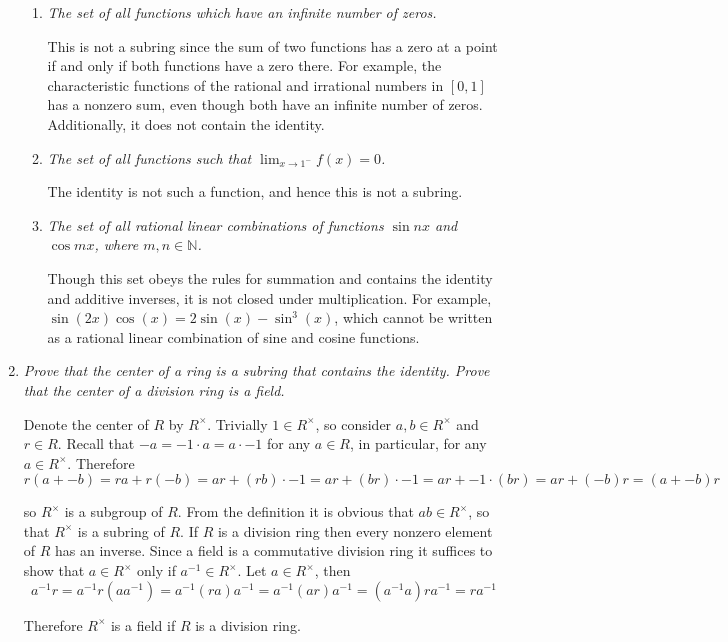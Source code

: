 \documentclass[letterpaper, 11pt]{article}
\newcommand{\N}{\mathbb{N}}
\begin{document}
\begin{enumerate}
\begin{enumerate}
\item \emph{The set of all functions which have an infinite number of zeros.}

This is not a subring since the sum of two functions has a zero at a point if and only if both functions have a zero there.  For example, the characteristic functions of the rational and irrational numbers in $[0,1]$ has a nonzero sum, even though both have an infinite number of zeros.  Additionally, it does not contain the identity.

\item \emph{The set of all functions such that $\lim_{x \rightarrow 1^-} f(x) = 0$.}

The identity is not such a function, and hence this is not a subring.

\item \emph{The set of all rational linear combinations of functions $\sin nx$ and $\cos mx$, where $m,n \in \N$.}

Though this set obeys the rules for summation and contains the identity and additive inverses, it is not closed under multiplication.  For example, $\sin(2x)\cos(x) = 2\sin(x) - \sin^3(x)$, which cannot be written as a rational linear combination of sine and cosine functions.

\end{enumerate}
\item \emph{Prove that the center of a ring is a subring that contains the identity.  Prove that the center of a division ring is a field.}

Denote the center of $R$ by $R^{\times}$.  Trivially $1 \in R^{\times}$, so consider $a,b \in R^{\times}$ and $r \in R$.  Recall that $-a = -1 \cdot a = a \cdot -1$ for any $a \in R$, in particular, for any $a \in R^{\times}$.  Therefore
\[
r(a + -b) = ra + r(-b) = ar + (rb) \cdot -1 = ar + (br) \cdot -1 = ar + -1 \cdot (br) = ar + (-b)r = (a+-b)r
\]

so $R^{\times}$ is a subgroup of $R$.  From the definition it is obvious that $ab \in R^{\times}$, so that $R^{\times}$ is a subring of $R$.  If $R$ is a division ring then every nonzero element of $R$ has an inverse.  Since a field is a commutative division ring it suffices to show that $a \in R^{\times}$ only if $a^{-1} \in R^{\times}$.  Let $a \in R^{\times}$, then
\[
a^{-1}r = a^{-1}r(aa^{-1}) = a^{-1}(ra)a^{-1} = a^{-1}(ar)a^{-1} = (a^{-1}a)ra^{-1} = ra^{-1}
\]

Therefore $R^{\times}$ is a field if $R$ is a division ring.


\end{enumerate}
\end{document}
